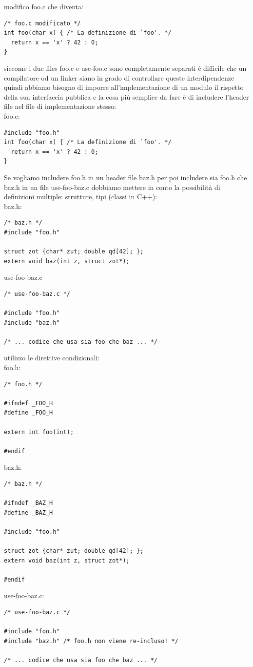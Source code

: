 \documentclass[a4paper,12pt, oneside]{book}
\begin{document}
	modifico foo.c che diventa:
	\begin{verbatim}
/* foo.c modificato */
int foo(char x) { /* La definizione di `foo'. */
  return x == 'x' ? 42 : 0;
}
\end{verbatim}
	\newpage
	siccome i due files foo.c e use-foo.c sono completamente
	separati è difficile che un compilatore od un linker siano in grado di controllare queste interdipendenze quindi abbiamo bisogno di imporre all'implementazione di un modulo il
	rispetto della sua interfaccia pubblica e la cosa più semplice da fare è di includere l'header file nel file di
	implementazione stesso:
	\\
	foo.c:
	\begin{verbatim}
#include "foo.h"
int foo(char x) { /* La definizione di `foo'. */
  return x == ‘x' ? 42 : 0;
}
\end{verbatim}
	Se vogliamo includere foo.h in un header file baz.h per poi includere sia foo.h che baz.h in un file use-foo-baz.c dobbiamo mettere in conto la possibilità di definizioni multiple: strutture, tipi (classi in C++):
	\\
	baz.h:
	\begin{verbatim}
/* baz.h */
#include "foo.h"

struct zot {char* zut; double qd[42]; };
extern void baz(int z, struct zot*);
\end{verbatim}
	use-foo-baz.c
	\begin{verbatim}
/* use-foo-baz.c */

#include "foo.h"
#include "baz.h"

/* ... codice che usa sia foo che baz ... */
\end{verbatim}
	utilizzo le direttive condizionali:\\
	foo.h:
	\begin{verbatim}
/* foo.h */

#ifndef _FOO_H
#define _FOO_H

extern int foo(int);

#endif
\end{verbatim}
	baz.h:
	\begin{verbatim}
/* baz.h */

#ifndef _BAZ_H
#define _BAZ_H

#include "foo.h"

struct zot {char* zut; double qd[42]; };
extern void baz(int z, struct zot*);

#endif
\end{verbatim}
	use-foo-baz.c:
	\begin{verbatim}
/* use-foo-baz.c */

#include "foo.h"
#include "baz.h" /* foo.h non viene re-incluso! */

/* ... codice che usa sia foo che baz ... */
\end{verbatim}
\end{document}
